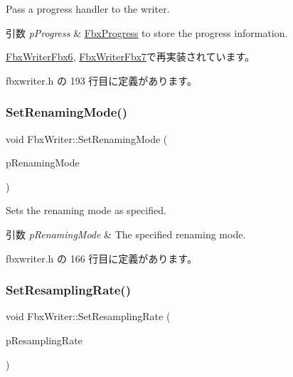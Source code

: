 Pass a progress handler to the writer. 
\begin{DoxyParams}{引数}
{\em p\+Progress} & \hyperlink{class_fbx_progress}{Fbx\+Progress} to store the progress information. \\
\hline
\end{DoxyParams}


\hyperlink{class_fbx_writer_fbx6_a3877fb079da98f7883ec977a5fe206f1}{Fbx\+Writer\+Fbx6}, \hyperlink{class_fbx_writer_fbx7_a80285d709aabb9d36f3f10d95cebf356}{Fbx\+Writer\+Fbx7}で再実装されています。



 fbxwriter.\+h の 193 行目に定義があります。

\mbox{\label{class_fbx_writer_aba927b8b74b98fae0074662a2924a6b0}} 
\subsubsection{\texorpdfstring{Set\+Renaming\+Mode()}{SetRenamingMode()}}
{\footnotesize\ttfamily void Fbx\+Writer\+::\+Set\+Renaming\+Mode (\begin{DoxyParamCaption}\item[{\hyperlink{class_fbx_scene_renamer_a9279ee1a645d6499b934adbc376f8678}{Fbx\+Scene\+Renamer\+::\+E\+Renaming\+Mode}}]{p\+Renaming\+Mode }\end{DoxyParamCaption})\hspace{0.3cm}{\ttfamily [inline]}}

Sets the renaming mode as specified. 
\begin{DoxyParams}{引数}
{\em p\+Renaming\+Mode} & The specified renaming mode. \\
\hline
\end{DoxyParams}


 fbxwriter.\+h の 166 行目に定義があります。

\mbox{\label{class_fbx_writer_aeed0e237cbed7c5ae6c29aa78932dbe6}} 
\subsubsection{\texorpdfstring{Set\+Resampling\+Rate()}{SetResamplingRate()}}
{\footnotesize\ttfamily void Fbx\+Writer\+::\+Set\+Resampling\+Rate (\begin{DoxyParamCaption}\item[{double}]{p\+Resampling\+Rate }\end{DoxyParamCaption})\hspace{0.3cm}{\ttfamily [inline]}}

